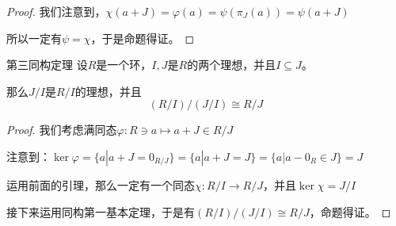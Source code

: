 \documentclass[12pt, a4paper, oneside, UTF8]{ctexbook}
\begin{document}
\begin{para}{0}
\begin{proof}
					我们注意到，$\chi(a+J)=\varphi (a)=\psi \left(\pi_{J}(a)\right)=\psi(a+J)$
					
					所以一定有$\psi =\chi $，于是命题得证。
				\end{proof}
				\begin{them}{第三同构定理}{}
					设$R$是一个环，$I,J$是$R$的两个理想，并且$I \subseteq J$。

					那么$J/I$是$R/I$的理想，并且
					\begin{equation}
						(R/I)/(J/I) \cong R/J
					\end{equation}
				\end{them}
				\begin{proof}
					我们考虑满同态$\varphi : R \ni a \mapsto a+J \in R/J$

					注意到：$\ker \varphi =\{a|a+J=0_{R/J}\}=\{a|a+J=J\}=\{a|a-0_R \in J\}=J$

					运用前面的引理，那么一定有一个同态$\chi : R/I \rightarrow R/J$，并且$\ker \chi =J/I$

					接下来运用同构第一基本定理，于是有$(R/I)/(J/I) \cong R/J$，命题得证。
				\end{proof}
		\end{para}
\end{document}
